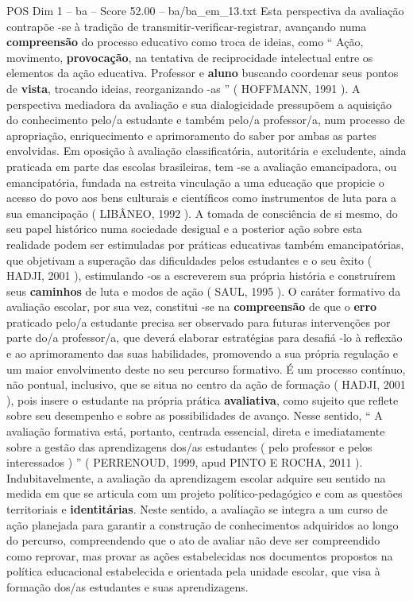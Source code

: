 \begin{textsample}{POS Dim 1 – ba – Score 52.00 – ba/ba\_em\_13.txt}
Esta perspectiva da avaliação contrapõe -se à tradição de transmitir-verificar-registrar, avançando numa \textbf{compreensão} do processo educativo como troca de ideias, como “ Ação, movimento, \textbf{provocação}, na tentativa de reciprocidade intelectual entre os elementos da ação educativa.
Professor e \textbf{aluno} buscando coordenar seus pontos de \textbf{vista}, trocando ideias, reorganizando -as ” ( HOFFMANN, 1991 ).
A perspectiva mediadora da avaliação e sua dialogicidade pressupõem a aquisição do conhecimento pelo/a estudante e também pelo/a professor/a, num processo de apropriação, enriquecimento e aprimoramento do saber por ambas as partes envolvidas.
Em oposição à avaliação classificatória, autoritária e excludente, ainda praticada em parte das escolas brasileiras, tem -se a avaliação emancipadora, ou emancipatória, fundada na estreita vinculação a uma educação que propicie o acesso do povo aos bens culturais e científicos como instrumentos de luta para a sua emancipação ( LIBÂNEO, 1992 ).
A tomada de consciência de si mesmo, do seu papel histórico numa sociedade desigual e a posterior ação sobre esta realidade podem ser estimuladas por práticas educativas também emancipatórias, que objetivam a superação das dificuldades pelos estudantes e o seu êxito ( HADJI, 2001 ), estimulando -os a escreverem sua própria história e construírem seus \textbf{caminhos} de luta e modos de ação ( SAUL, 1995 ).
O caráter formativo da avaliação escolar, por sua vez, constitui -se na \textbf{compreensão} de que o \textbf{erro} praticado pelo/a estudante precisa ser observado para futuras intervenções por parte do/a professor/a, que deverá elaborar estratégias para desafiá -lo à reflexão e ao aprimoramento das suas habilidades, promovendo a sua própria regulação e um maior envolvimento deste no seu percurso formativo.
É um processo contínuo, não pontual, inclusivo, que se situa no centro da ação de formação ( HADJI, 2001 ), pois insere o estudante na própria prática \textbf{avaliativa}, como sujeito que reflete sobre seu desempenho e sobre as possibilidades de avanço.
Nesse sentido, “ A avaliação formativa está, portanto, centrada essencial, direta e imediatamente sobre a gestão das aprendizagens dos/as estudantes ( pelo professor e pelos interessados ) ” ( PERRENOUD, 1999, apud PINTO E ROCHA, 2011 ).
Indubitavelmente, a avaliação da aprendizagem escolar adquire seu sentido na medida em que se articula com um projeto político-pedagógico e com as questões territoriais e \textbf{identitárias}.
Neste sentido, a avaliação se integra a um curso de ação planejada para garantir a construção de conhecimentos adquiridos ao longo do percurso, compreendendo que o ato de avaliar não deve ser compreendido como reprovar, mas provar as ações estabelecidas nos documentos propostos na política educacional estabelecida e orientada pela unidade escolar, que visa à formação dos/as estudantes e suas aprendizagens.

\end{textsample}
